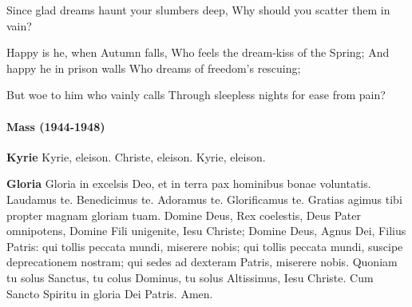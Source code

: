\documentclass[11pt, ngermanm, titlepage]{article}
\begin{document}
\begin{multicols}{2}
	Since glad dreams haunt your slumbers deep,\newline
	Why should you scatter them in vain?\newline
	
	Happy is he, when Autumn falls,\newline
	Who feels the dream-kiss of the Spring;\newline
	And happy he in prison walls\newline
	Who dreams of freedom's rescuing;\newline
	
	But woe to him who vainly calls\newline
	Through sleepless nights for ease from pain?\newline
	
	\paragraph{Mass (1944-1948)\newline}
	\textbf{Kyrie}\newline
	Kyrie, eleison.\newline
	Christe, eleison.\newline
	Kyrie, eleison.\newline
	
	\textbf{Gloria}\newline
	Gloria in excelsis Deo,\newline
	et in terra pax hominibus bonae voluntatis.\newline
	Laudamus te. Benedicimus te.\newline
	Adoramus te. Glorificamus te.\newline
	Gratias agimus tibi propter magnam gloriam tuam.\newline
	Domine Deus, Rex coelestis,\newline
	Deus Pater omnipotens,\newline
	Domine Fili unigenite, Iesu Christe;\newline
	Domine Deus, Agnus Dei, Filius Patris:\newline
	qui tollis peccata mundi,\newline
	miserere nobis;\newline
	qui tollis peccata mundi,\newline
	suscipe deprecationem nostram;\newline
	qui sedes ad dexteram Patris,\newline
	miserere nobis.\newline
	Quoniam tu solus Sanctus,\newline
	tu colus Dominus,\newline
	tu solus Altissimus, Iesu Christe.\newline
	Cum Sancto Spiritu in gloria Dei Patris.\newline
	Amen.\newline
	

\end{multicols}
\end{document}
